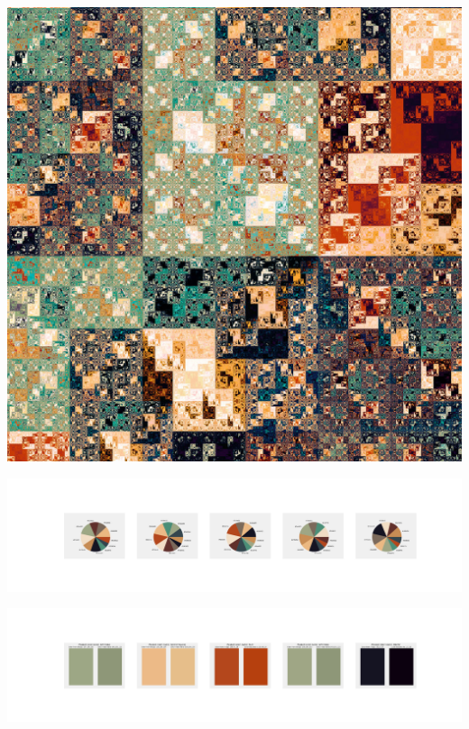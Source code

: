 \documentclass[11pt]{article}
\begin{document}
\begin{landscape}
    \begin{center}
    \includegraphics[width=\textwidth]{./nbimg/file (439).jpg}
    \end{center}

    \begin{center}
    \includegraphics[width=250mm]{./nbimg/pie-377.jpg}
    \end{center}

    \begin{center}
    \includegraphics[width=250mm]{./nbimg/peak-377.jpg}
    \end{center}
    


\end{landscape}
\end{document}
